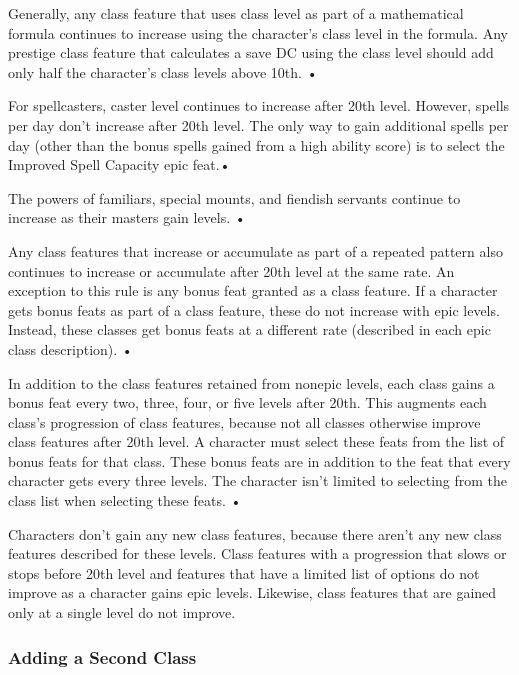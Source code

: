 \documentclass{article}
\begin{document}
Generally, any class feature that uses class level as part of a mathematical formula 
continues to increase using the character's class level in the formula.  Any prestige 
class feature that calculates a save DC using the class level should add only half 
the character's class levels above 10th. • 

For spellcasters, caster level continues to increase after 20th level. However, 
spells per day don't increase after 20th level. The only way to gain additional 
spells per day (other than the bonus spells gained from a high ability score) is 
to select the Improved Spell Capacity epic feat.• 

The powers of familiars, special mounts, and fiendish servants continue to increase 
as their masters gain levels. • 

Any class features that increase or accumulate as part of a repeated pattern also 
continues to increase or accumulate after 20th level at the same rate.  An exception 
to this rule is any bonus feat granted as a class feature. If a character gets 
bonus feats as part of a class feature, these do not increase with epic levels. 
Instead, these classes get bonus feats at a different rate (described in each epic 
class description). • 

In addition to the class features retained from nonepic levels, each class gains 
a bonus feat every two, three, four, or five levels after 20th. This augments each 
class's progression of class features, because not all classes otherwise improve 
class features after 20th level. A character must select these feats from the list 
of bonus feats for that class. These bonus feats are in addition to the feat that 
every character gets every three levels. The character isn't limited to selecting 
from the class list when selecting these feats. • 

Characters don't gain any new class features, because there aren't any new class 
features described for these levels. Class features with a progression that slows 
or stops before 20th level and features that have a limited list of options do 
not improve as a character gains epic levels. Likewise, class features that are 
gained only at a single level do not improve. 

\vspace{12pt}
\subsubsection*{Adding a Second Class }
\end{document}
